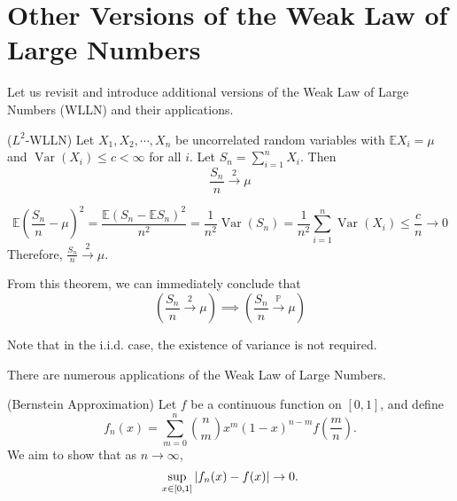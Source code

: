 \documentclass{huhtakm-template-book}
\newcommand{\prob}{\mathbb{P}}
\newcommand{\expect}{\mathbb{E}}
\DeclareMathOperator{\Var}{Var}
\begin{document}
\section{Other Versions of the Weak Law of Large Numbers}
    Let us revisit and introduce additional versions of the Weak Law of Large Numbers (WLLN) and their applications.
    \begin{thm}($L^{2}$-WLLN) 
        Let $X_{1},X_{2},\cdots,X_{n}$ be uncorrelated random variables with $\expect X_{i}=\mu$ and $\Var(X_{i})\leq c<\infty$ for all $i$. Let $S_{n}=\sum_{i=1}^{n}X_{i}$. Then
        \begin{equation*}
            \frac{S_{n}}{n}\xrightarrow{2}\mu
        \end{equation*}
    \end{thm}
    \begin{proofing}
        \begin{equation*}
            \expect\left(\frac{S_{n}}{n}-\mu\right)^{2}=\frac{\expect(S_{n}-\expect S_{n})^{2}}{n^{2}}=\frac{1}{n^{2}}\Var(S_{n})=\frac{1}{n^{2}}\sum_{i=1}^{n}\Var(X_{i})\leq\frac{c}{n}\to 0
        \end{equation*}
        Therefore, $\frac{S_{n}}{n}\xrightarrow{2}\mu$.
    \end{proofing}
    \begin{rem}
        From this theorem, we can immediately conclude that
        \begin{equation*}
            \left(\frac{S_{n}}{n}\xrightarrow{2}\mu\right)\implies\left(\frac{S_{n}}{n}\xrightarrow{\prob}\mu\right)
        \end{equation*}
    \end{rem}
    \begin{rem}
        Note that in the i.i.d. case, the existence of variance is not required.
    \end{rem}
    There are numerous applications of the Weak Law of Large Numbers.
    \begin{eg}(Bernstein Approximation)
        Let $f$ be a continuous function on $[0,1]$, and define
        \begin{equation*}
            \tag{Bernstein Polynomial}
            f_{n}(x)=\sum_{m=0}^{n}\binom{n}{m}x^{m}(1-x)^{n-m}f\left(\frac{m}{n}\right).
        \end{equation*}
        We aim to show that as $n\to\infty$,
        \begin{equation*}
            \sup_{x\in[0,1]}\left|{f_{n}(x)-f(x)}\right|\to 0.
        \end{equation*}
    \end{eg}
\end{document}
